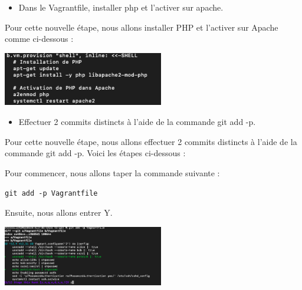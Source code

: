 \documentclass[12pt]{article}
\begin{document}
\vspace{0.3cm}

\begin{itemize}
  \item Dans le Vagrantfile, installer php et l'activer sur apache.
\end{itemize}

\vspace{0.3cm}

Pour cette nouvelle étape, nous allons installer PHP et l'activer sur Apache comme ci-dessous :

\vspace{0.3cm}

\begin{center}
  \includegraphics[width=7cm]{Image-TD-Git-2/php-apache.png}
\end{center}

\vspace{0.3cm}

\begin{itemize}
  \item Effectuer 2 commits distincts à l'aide de la commande git add -p.
\end{itemize}

\vspace{0.3cm}

Pour cette nouvelle étape, nous allons effectuer 2 commits distincts à l'aide de la commande git add -p. Voici les étapes ci-dessous :

\vspace{0.3cm}

Pour commencer, nous allons taper la commande suivante :

\texttt{git add -p Vagrantfile}

\vspace{0.3cm}

Ensuite, nous allons entrer Y.

\vspace{0.3cm}

\begin{center}
  \includegraphics[width=7cm]{Image-TD-Git-2/git-add-1.png}
\end{center}
\end{document}
